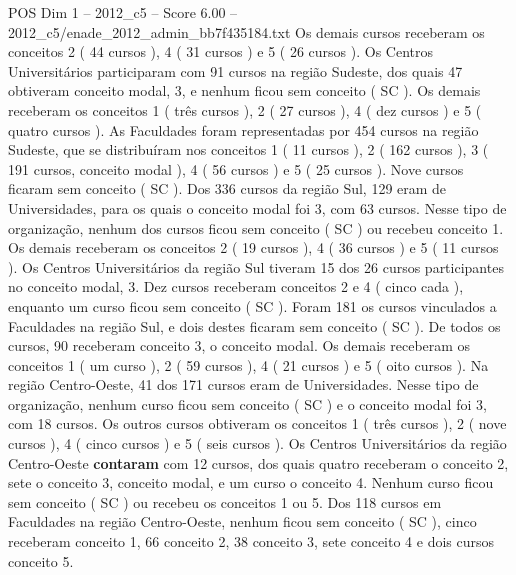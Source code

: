 \begin{textsample}{POS Dim 1 – 2012\_c5 – Score 6.00 – 2012\_c5/enade\_2012\_admin\_bb7f435184.txt}
Os demais cursos receberam os conceitos 2 ( 44 cursos ), 4 ( 31 cursos ) e 5 ( 26 cursos ).
Os Centros Universitários participaram com 91 cursos na região Sudeste, dos quais 47 obtiveram conceito modal, 3, e nenhum ficou sem conceito ( SC ).
Os demais receberam os conceitos 1 ( três cursos ), 2 ( 27 cursos ), 4 ( dez cursos ) e 5 ( quatro cursos ).
As Faculdades foram representadas por 454 cursos na região Sudeste, que se distribuíram nos conceitos 1 ( 11 cursos ), 2 ( 162 cursos ), 3 ( 191 cursos, conceito modal ), 4 ( 56 cursos ) e 5 ( 25 cursos ).
Nove cursos ficaram sem conceito ( SC ).
Dos 336 cursos da região Sul, 129 eram de Universidades, para os quais o conceito modal foi 3, com 63 cursos.
Nesse tipo de organização, nenhum dos cursos ficou sem conceito ( SC ) ou recebeu conceito 1.
Os demais receberam os conceitos 2 ( 19 cursos ), 4 ( 36 cursos ) e 5 ( 11 cursos ).
Os Centros Universitários da região Sul tiveram 15 dos 26 cursos participantes no conceito modal, 3.
Dez cursos receberam conceitos 2 e 4 ( cinco cada ), enquanto um curso ficou sem conceito ( SC ).
Foram 181 os cursos vinculados a Faculdades na região Sul, e dois destes ficaram sem conceito ( SC ).
De todos os cursos, 90 receberam conceito 3, o conceito modal.
Os demais receberam os conceitos 1 ( um curso ), 2 ( 59 cursos ), 4 ( 21 cursos ) e 5 ( oito cursos ).
Na região Centro-Oeste, 41 dos 171 cursos eram de Universidades.
Nesse tipo de organização, nenhum curso ficou sem conceito ( SC ) e o conceito modal foi 3, com 18 cursos.
Os outros cursos obtiveram os conceitos 1 ( três cursos ), 2 ( nove cursos ), 4 ( cinco cursos ) e 5 ( seis cursos ).
Os Centros Universitários da região Centro-Oeste \textbf{contaram} com 12 cursos, dos quais quatro receberam o conceito 2, sete o conceito 3, conceito modal, e um curso o conceito 4.
Nenhum curso ficou sem conceito ( SC ) ou recebeu os conceitos 1 ou 5.
Dos 118 cursos em Faculdades na região Centro-Oeste, nenhum ficou sem conceito ( SC ), cinco receberam conceito 1, 66 conceito 2, 38 conceito 3, sete conceito 4 e dois cursos conceito 5.

\end{textsample}

